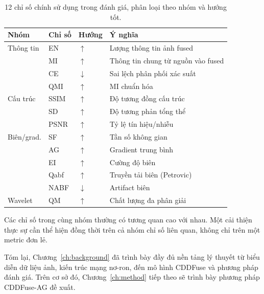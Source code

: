 \begin{table}[H]
\centering
\small
\caption{12 chỉ số chính sử dụng trong đánh giá, phân loại theo nhóm và hướng tốt.}
\label{tab:metrics-summary}
\setlength{\tabcolsep}{5pt}
\begin{tabular}{llll}
\toprule
\textbf{Nhóm} & \textbf{Chỉ số} & \textbf{Hướng} & \textbf{Ý nghĩa} \\
\midrule
Thông tin   & EN            & $\uparrow$   & Lượng thông tin ảnh fused \\
            & MI            & $\uparrow$   & Thông tin chung từ nguồn vào fused \\
            & CE            & $\downarrow$ & Sai lệch phân phối xác suất \\
            & QMI           & $\uparrow$   & MI chuẩn hóa \\
\midrule
Cấu trúc    & SSIM          & $\uparrow$   & Độ tương đồng cấu trúc \\
            & SD            & $\uparrow$   & Độ tương phản tổng thể \\
            & PSNR          & $\uparrow$   & Tỷ lệ tín hiệu/nhiễu \\
\midrule
Biên/grad.  & SF            & $\uparrow$   & Tần số không gian \\
            & AG            & $\uparrow$   & Gradient trung bình \\
            & EI            & $\uparrow$   & Cường độ biên \\
            & Qabf          & $\uparrow$   & Truyền tải biên (Petrovic) \\
            & NABF          & $\downarrow$ & Artifact biên \\
\midrule
Wavelet     & QM            & $\uparrow$   & Chất lượng đa phân giải \\
\bottomrule
\end{tabular}
\end{table}

Các chỉ số trong cùng nhóm thường có tương quan cao với nhau. Một cải thiện thực sự cần thể hiện đồng thời trên cả nhóm chỉ số liên quan, không chỉ trên một metric đơn lẻ.

Tóm lại, Chương~\ref{ch:background} đã trình bày đầy đủ nền tảng lý thuyết từ biểu diễn dữ liệu ảnh, kiến trúc mạng nơ-ron, đến mô hình CDDFuse và phương pháp đánh giá. Trên cơ sở đó, Chương~\ref{ch:method} tiếp theo sẽ trình bày phương pháp CDDFuse-AG đề xuất.
